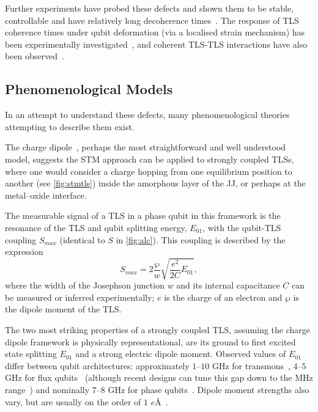 Further experiments have probed these defects and shown them to be stable, controllable and have relatively long decoherence times~\cite{Simmonds2004, Neeley2008, Shalibo2010, Lupascu2009, Gunnarsson2013}.
The response of TLS coherence times under qubit deformation (via a localised strain mechanism) has been experimentally investigated~\cite{Grabovskij2012}, and coherent TLS-TLS interactions have also been observed~\cite{Lisenfeld2015}.

\subsection{Phenomenological Models}\label{sec:phenom}

In an attempt to understand these defects, many phenomenological theories attempting to describe them exist.

The charge dipole~\cite{Martinis2005}, perhaps the most straightforward and well understood model, suggests the STM approach can be applied to strongly coupled TLSs, where one would consider a charge hopping from one equilibrium position to another (see \cref{fig:stmtls}) inside the amorphous layer of the JJ, or perhaps at the metal--oxide interface.

The measurable signal of a TLS in a phase qubit in this framework is the resonance of the TLS and qubit splitting energy, $E_{01}$, with the qubit-TLS coupling $S_{max}$ (identical to $S$ in \cref{fig:alc}).
This coupling is described by the expression~\cite{Martinis2005}
\begin{equation}
    S_{max}=2\frac{\wp}{w}\sqrt{\frac{e^2}{2C}E_{01}},
\label{eq:smax}
\end{equation}
where the width of the Josephson junction $w$ and its internal capacitance $C$ can be measured or inferred experimentally; $e$ is the charge of an electron and $\wp$ is the dipole moment of the TLS.

The two most striking properties of a strongly coupled TLS, assuming the charge dipole framework is physically representational, are its ground to first excited state splitting $E_{01}$ and a strong electric dipole moment.
Observed values of $E_{01}$  differ between qubit architectures: approximately $1$--$10$ GHz for transmons~\cite{Koch2007}, $4$--$5$ GHz for flux qubits~\cite{Lupascu2009} (although recent designs can tune this gap down to the MHz range~\cite{Schwarz2013}) and nominally $7$--$8$ GHz for phase qubits~\cite{Cole2010}.
Dipole moment strengths also vary, but are usually on the order of $1$ $e$\AA\ \cite{Cole2010,Shalibo2010}.

